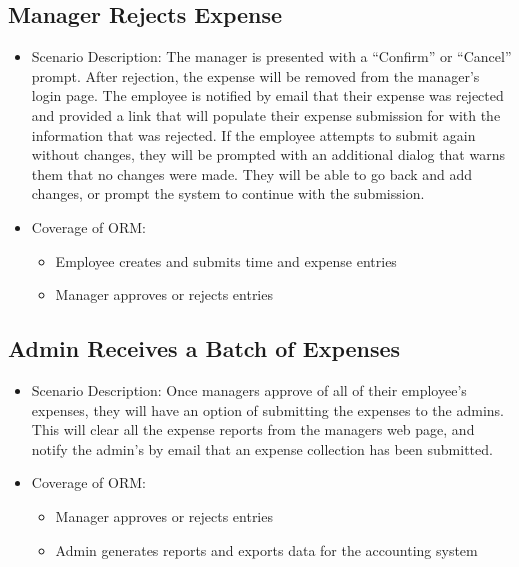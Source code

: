 \documentclass[12pt]{article}
\begin{document}
\subsection{ Manager Rejects Expense}
\begin{itemize}
\item Scenario Description: The manager is presented with a “Confirm” or “Cancel” prompt. After rejection, the expense will be removed from the manager’s login page. The employee is notified by email that their expense was rejected and provided a link that will populate their expense submission for with the information that was rejected. If the employee attempts to submit again without changes, they will be prompted with an additional dialog that warns them that no changes were made. They will be able to go back and add changes, or prompt the system to continue with the submission.
\item Coverage of ORM:
\begin{itemize}
\item Employee creates and submits time and expense entries
\item Manager approves or rejects entries
\end{itemize}
\end{itemize}

\subsection{ Admin Receives a Batch of Expenses}
\begin{itemize}
\item Scenario Description:
Once managers approve of all of their employee’s expenses, they will have an option of submitting the expenses to the admins. This will clear all the expense reports from the managers web page, and notify the admin’s by email that an expense collection has been submitted. 
\item Coverage of ORM:
\begin{itemize}
\item Manager approves or rejects entries\\
\item Admin generates reports and exports data for the accounting system
\end{itemize}
\end{itemize}
\end{document}
